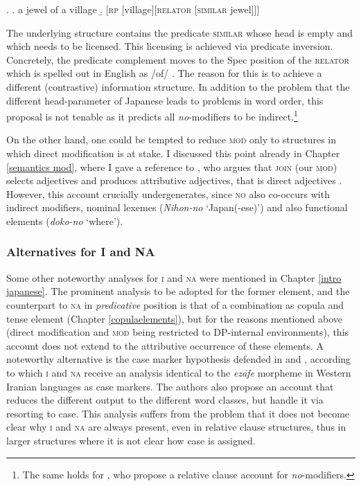 \documentclass [output=book,colorlinks,citecolor=brown]{langscibook}
\begin{document}

\ex. \a. a jewel of a village \hfill \citep[162]{dikken:2006:relators}
\b. [\textsc{rp} [village][\textsc{relator} [\textsc{similar} jewel]]] \hfill \citep[178]{dikken:2006:relators}

The underlying structure contains the predicate \textsc{similar} whose head is empty and which needs to be licensed. This licensing is achieved via predicate inversion. Concretely, the predicate complement moves to the Spec position of the \textsc{relator} which is spelled out in English as /of/ \citep[ch. 5]{dikken:2006:relators}. The reason for this is to achieve a different (contrastive) information structure. In addition to the problem that the different head-parameter of Japanese leads to problems in word order, this proposal is not tenable as it predicts all \textit{no}-modifiers to be indirect.\footnote{The same holds for \citet{koopman:2016:further}, who propose a relative clause account for \textit{no}-modifiers.}

On the other hand, one could be tempted to reduce \textsc{mod} only to structures in which direct modification is at stake. I discussed this point already in Chapter \ref{semantics mod}, where I gave a reference to \citet{belk:2017:attributes}, who argues that \textsc{join} (our \textsc{mod}) selects adjectives and produces attributive adjectives, that is direct adjectives \citep[ch. 2.3]{belk:2017:attributes}. However, this account crucially undergenerates, since \textsc{no} also co-occurs with indirect modifiers, nominal lexemes (\textit{Nihon-no} `Japan(-ese)’) and also functional elements (\textit{doko-no} `where’).

\subsubsection{Alternatives for I and NA}

Some other noteworthy analyses for \textsc{i} and \textsc{na} were mentioned in Chapter \ref{intro japanese}. The prominent analysis to be adopted for the former element, and the counterpart to \textsc{na} in \textit{predicative} position is that of a combination as copula and tense element (Chapter \ref{copulaelements}), but for the reasons mentioned above (direct modification and \textsc{mod} being restricted to DP-internal environments), this account does not extend to the attributive occurrence of these elements. A noteworthy alternative is the case marker hypothesis defended in \citet{yamakido:2005:nature} and \citet{larson:2008:ezafe}, according to which \textsc{i} and \textsc{na} receive an analysis identical to the \textit{ezāfe} morpheme in Western Iranian languages as case markers. The authors also propose an account that reduces the different output to the different word classes, but handle it via resorting to case. This analysis suffers from the problem that it does not become clear why \textsc{i} and \textsc{na} are always present, even in relative clause structures, thus in larger structures where it is not clear how case is assigned. %
\end{document}

